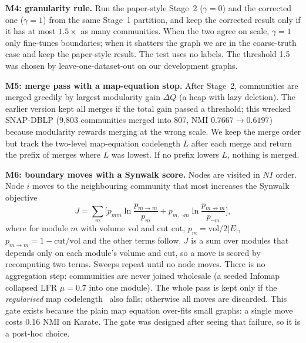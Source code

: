 \documentclass[conference]{IEEEtran}
\begin{document}
\textbf{M4: granularity rule.} Run the paper-style Stage~2 ($\gamma{=}0$) and the corrected one ($\gamma{=}1$) from the same Stage~1 partition, and keep the corrected result only if it has at most $1.5\times$ as many communities. When the two agree on scale, $\gamma{=}1$ only fine-tunes boundaries; when it shatters the graph we are in the coarse-truth case and keep the paper-style result. The test uses no labels. The threshold 1.5 was chosen by leave-one-dataset-out on our development graphs.

\textbf{M5: merge pass with a map-equation stop.} After Stage~2, communities are merged greedily by largest modularity gain $\Delta Q$ (a heap with lazy deletion). The earlier version kept all merges if the total gain passed a threshold; this wrecked SNAP-DBLP (9{,}803 communities merged into 807, NMI $0.7667\to0.6197$) because modularity rewards merging at the wrong scale. We keep the merge order but track the two-level map-equation codelength $L$ after each merge and return the prefix of merges where $L$ was lowest. If no prefix lowers $L$, nothing is merged.

\textbf{M6: boundary moves with a Synwalk score.} Nodes are visited in $NI$ order. Node $i$ moves to the neighbouring community that most increases the Synwalk objective~\cite{toth2022}
\begin{equation}
J=\sum_{m}\Big[p_{mm}\ln\frac{p_{m\to m}}{p_m}+p_{m,\neg m}\ln\frac{p_{m\not\to m}}{p_{\neg m}}\Big],\label{eq:synwalk}
\end{equation}
where for module $m$ with volume $\mathrm{vol}$ and cut $\mathrm{cut}$, $p_m=\mathrm{vol}/2|E|$, $p_{m\to m}=1-\mathrm{cut}/\mathrm{vol}$ and the other terms follow. $J$ is a sum over modules that depends only on each module's volume and cut, so a move is scored by recomputing two terms. Sweeps repeat until no node moves. There is no aggregation step: communities are never joined wholesale (a seeded Infomap collapsed LFR $\mu{=}0.7$ into one module). The whole pass is kept only if the \emph{regularised} map codelength~\cite{smiljanic2020} also falls; otherwise all moves are discarded. This gate exists because the plain map equation over-fits small graphs: a single move costs 0.16 NMI on Karate. The gate was designed after seeing that failure, so it is a post-hoc choice.
\end{document}
